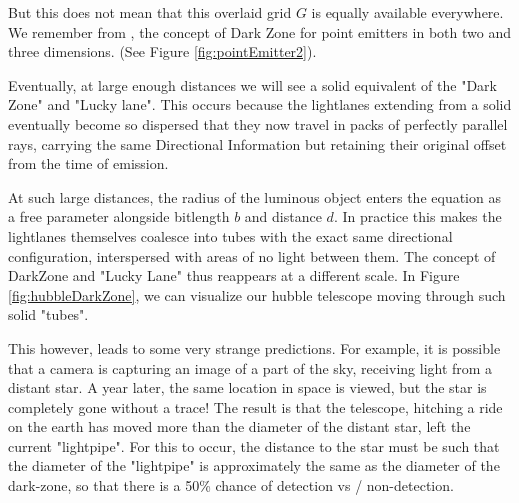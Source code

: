 \documentclass[notitlepage]{article}
\begin{document}
But this does not mean that this overlaid grid $G$ is equally available everywhere. We remember from \citep{RhadamantysA2}, the concept of Dark Zone for point emitters in both two and three dimensions. (See Figure \ref{fig:pointEmitter2}). 

Eventually, at large enough distances we will see a solid equivalent of the "Dark Zone" and "Lucky lane". This occurs because the lightlanes extending from a solid eventually become so dispersed that they now travel in packs of perfectly parallel rays, carrying the same Directional Information but retaining their original offset from the time of emission. 

At such large distances, the radius of the luminous object enters the equation as a free parameter alongside bitlength $b$ and distance $d$. In practice this makes the lightlanes themselves coalesce into tubes with the exact same directional configuration, interspersed with areas of no light between them. The concept of DarkZone and "Lucky Lane" thus reappears at a different scale. In Figure  \ref{fig:hubbleDarkZone}, we can visualize our hubble telescope moving through such solid "tubes". 

This however, leads to some very strange predictions. For example, it is possible that a camera is capturing an image of a part of the sky, receiving light from a distant star. A year later, the same location in space is viewed, but the  star is completely gone without a trace! The result is that the telescope, hitching a ride on the earth has moved more than the diameter of the distant star,  left the current "lightpipe". For this to occur, the distance to the star must be such that the diameter of the "lightpipe" is approximately the same as the diameter of the dark-zone, so that there is a 50\% chance of detection vs / non-detection.




\begin{figure}
\centering

\end{figure}




\end{document}
